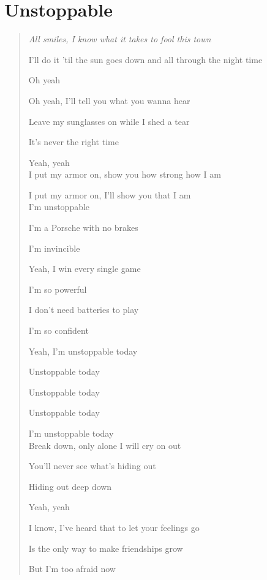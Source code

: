 \documentclass{book}
\numberwithin{equation}{section}
\begin{document}
\section{Unstoppable}

\begin{quotation}\it
    All smiles, I know what it takes to fool this town
    
    I'll do it 'til the sun goes down and all through the night time
    
    Oh yeah
    
    Oh yeah, I'll tell you what you wanna hear
    
    Leave my sunglasses on while I shed a tear
    
    It's never the right time
    
    Yeah, yeah
    \\
    
    I put my armor on, show you how strong how I am
    
    I put my armor on, I'll show you that I am
    \\
    
    I'm unstoppable
    
    I'm a Porsche with no brakes
    
    I'm invincible
    
    Yeah, I win every single game
    
    I'm so powerful
    
    I don't need batteries to play
    
    I'm so confident
    
    Yeah, I'm unstoppable today
    
    Unstoppable today
    
    Unstoppable today
    
    Unstoppable today
    
    I'm unstoppable today
    \\
    
    Break down, only alone I will cry on out
    
    You'll never see what's hiding out
    
    Hiding out deep down
    
    Yeah, yeah
    
    I know, I've heard that to let your feelings go
    
    Is the only way to make friendships grow
    
    But I'm too afraid now
    

\end{quotation}
\end{document}
